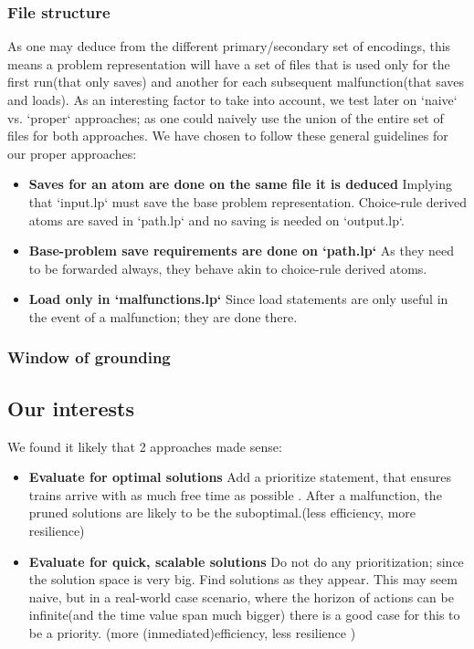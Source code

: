 \documentclass[runningheads]{llncs}
\begin{document}
 
\subsubsection{File structure}

As one may deduce from the different primary/secondary set of encodings, this means a problem representation will have a set of files that is used only for the first run(that only saves) and another for each subsequent malfunction(that saves and loads). As an interesting factor to take into account, we test later on `naive` vs. `proper` approaches; as one could naively use the union of the entire set of files for both approaches. We have chosen to follow these general guidelines for our proper approaches:
\begin{itemize}
	\item  \textbf{Saves for an atom are done on the same file it is deduced} Implying that `input.lp` must save the base problem representation. Choice-rule derived atoms are saved in `path.lp` and no saving is needed on `output.lp`. 
	\item  \textbf{Base-problem save requirements are done on `path.lp`} As they need to be forwarded always, they behave akin to choice-rule derived atoms.  
	\item  \textbf{Load only in `malfunctions.lp`}  Since load statements are only useful in the event of a malfunction; they are done there. 
\end{itemize}

\subsubsection{Window of grounding}



\subsection{Our interests}

We found it likely that 2 approaches made sense:
\begin{itemize}
	\item  \textbf{Evaluate for optimal solutions} Add a prioritize statement, that ensures trains arrive with as much free time as possible . After a malfunction, the pruned solutions are likely to be the suboptimal.(less efficiency, more resilience)
	\item  \textbf{Evaluate for quick, scalable solutions} Do not do any prioritization; since the solution space is very big. Find solutions as they appear. This may seem naive, but in a real-world case scenario, where the horizon of actions can be infinite(and the time value span much bigger)  there is a good case for this to be a priority. (more (inmediated)efficiency, less resilience )
\end{itemize}
\end{document}
